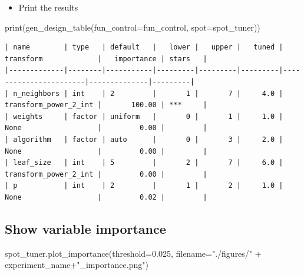 \documentclass[
  letterpaper,
  DIV=11,
  numbers=noendperiod]{scrreprt}
\newenvironment{Shaded}{\begin{snugshade}}{\end{snugshade}}
\newcommand{\BuiltInTok}[1]{\textcolor[rgb]{0.00,0.23,0.31}{#1}}
\newcommand{\FloatTok}[1]{\textcolor[rgb]{0.68,0.00,0.00}{#1}}
\newcommand{\NormalTok}[1]{\textcolor[rgb]{0.00,0.23,0.31}{#1}}
\newcommand{\OperatorTok}[1]{\textcolor[rgb]{0.37,0.37,0.37}{#1}}
\newcommand{\StringTok}[1]{\textcolor[rgb]{0.13,0.47,0.30}{#1}}
\providecommand{\tightlist}{%
  \setlength{\itemsep}{0pt}\setlength{\parskip}{0pt}}\usepackage{longtable,booktabs,array}
\begin{document}
\begin{itemize}
\tightlist
\item
  Print the results
\end{itemize}

\begin{Shaded}
\begin{Highlighting}[]
\BuiltInTok{print}\NormalTok{(gen\_design\_table(fun\_control}\OperatorTok{=}\NormalTok{fun\_control,}
\NormalTok{    spot}\OperatorTok{=}\NormalTok{spot\_tuner))}
\end{Highlighting}
\end{Shaded}

\begin{verbatim}
| name        | type   | default   |   lower |   upper |   tuned | transform             |   importance | stars   |
|-------------|--------|-----------|---------|---------|---------|-----------------------|--------------|---------|
| n_neighbors | int    | 2         |       1 |       7 |     4.0 | transform_power_2_int |       100.00 | ***     |
| weights     | factor | uniform   |       0 |       1 |     1.0 | None                  |         0.00 |         |
| algorithm   | factor | auto      |       0 |       3 |     2.0 | None                  |         0.00 |         |
| leaf_size   | int    | 5         |       2 |       7 |     6.0 | transform_power_2_int |         0.00 |         |
| p           | int    | 2         |       1 |       2 |     1.0 | None                  |         0.02 |         |
\end{verbatim}

\hypertarget{show-variable-importance-4}{%
\subsection{Show variable importance}\label{show-variable-importance-4}}

\begin{Shaded}
\begin{Highlighting}[]
\NormalTok{spot\_tuner.plot\_importance(threshold}\OperatorTok{=}\FloatTok{0.025}\NormalTok{, filename}\OperatorTok{=}\StringTok{"./figures/"} \OperatorTok{+}\NormalTok{ experiment\_name}\OperatorTok{+}\StringTok{"\_importance.png"}\NormalTok{)}
\end{Highlighting}
\end{Shaded}
\end{document}

